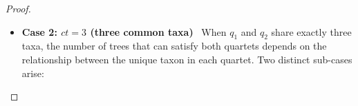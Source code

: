 \documentclass[10pt,a4paper]{article}
\newcommand{\addb}[1]{{\color{red} #1}}
\begin{document}
\begin{proof}
\begin{itemize}
    
    
    

\item \textbf{Case 2: $ct = 3$ (three common taxa)} \ When $q_1$ and $q_2$ share exactly three taxa, the number of trees that can satisfy both quartets depends on the relationship between the unique taxon in each quartet. Two distinct sub-cases arise:


\end{itemize}
\end{proof}
\end{document}
